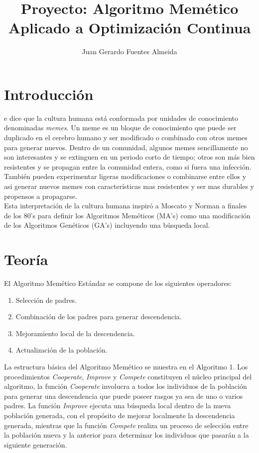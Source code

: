 \documentclass[10pt,journal,compsoc]{styles/IEEEtran}
\title{Proyecto: Algoritmo Mem\'etico Aplicado a Optimizaci\'on Continua}
\author{Juan Gerardo Fuentes Almeida}
\begin{document}
\maketitle

\IEEEdisplaynontitleabstractindextext

\IEEEpeerreviewmaketitle

\section{Introducci\'on}

e dice que la cultura humana est\'a conformada por unidades de conocimiento denominadas \emph{memes}. Un meme es un bloque de conocimiento que puede ser duplicado en el cerebro humano y ser modificado o combinado con otros memes para generar nuevos. Dentro de un comunidad, algunos memes sencillamente no son interesantes y se extinguen en un periodo corto de tiempo; otros son m\'as bien resistentes y se propagan entre la comunidad entera, como si fuera una infección. También pueden experimentar ligeras modificaciones o combinarse entre ellos y asi generar nuevos memes con características mas resistentes y ser mas durables y propensos a propagarse.\\

Esta interpretación de la cultura humana inspir\'o a Moscato y Norman a finales de los 80's para definir los Algoritmos Mem\'eticos (MA's) como una modificación de los Algoritmos Genéticos (GA's) incluyendo una búsqueda local.\\

	
\section{Teoría}

El Algoritmo Mem\'etico Estándar se compone de los siguientes operadores:\\

	\begin{enumerate}
	\item Selección de padres.
	\item Combinación de los padres para generar descendencia.
	\item Mejoramiento local de la descendencia.
	\item Actualización de la población.
	\end{enumerate}

La estructura básica del Algoritmo Mem\'etico se muestra en el Algoritmo 1. Los procedimientos \emph{Cooperate}, \emph{Improve} y \emph{Compete} constituyen el núcleo principal del algoritmo, la función \emph{Cooperate} involucra a todos los individuos de la población para generar una descendencia que puede poseer rasgos ya sea de uno o varios padres. La función \emph{Improve} ejecuta una búsqueda local dentro de la nueva población generada, con el propósito de mejorar localmente la descendencia generada, mientras que la función \emph{Compete} realiza un proceso de selección entre la población nueva y la anterior para determinar los individuos que pasar\'an a la siguiente generación.
\end{document}
